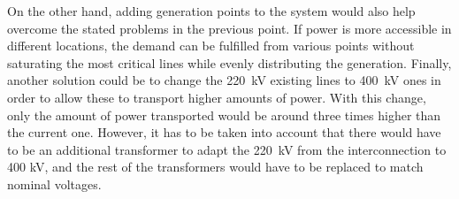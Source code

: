 On the other hand, adding generation points to the system would also help overcome the stated problems in the previous point. If power is more accessible in different locations, the demand can be fulfilled from various points without saturating the most critical lines while evenly distributing the generation. Finally, another solution could be to change the 220~kV existing lines to 400~kV ones in order to allow these to transport higher amounts of power. With this change, only the amount of power transported would be around three times higher than the current one. However, it has to be taken into account that there would have to be an additional transformer to adapt the 220~kV from the interconnection to 400 kV, and the rest of the transformers would have to be replaced to match nominal voltages. 


